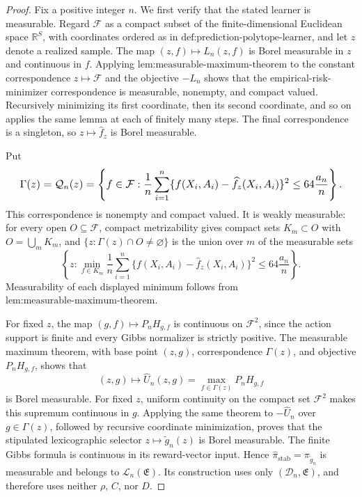 \documentclass{article}
\begin{document}
\begin{proof}
Fix a positive integer \(n\). We first verify that the stated learner is measurable. Regard \(\mathcal F\) as a compact subset of the finite-dimensional Euclidean space \(\mathbb R^S\), with coordinates ordered as in \(\text{def:prediction-polytope-learner}\), and let \(z\) denote a realized sample. The map \((z,f)\mapsto L_n(z,f)\) is Borel measurable in \(z\) and continuous in \(f\). Applying \(\text{lem:measurable-maximum-theorem}\) to the constant correspondence \(z\mapsto\mathcal F\) and the objective \(-L_n\) shows that the empirical-risk-minimizer correspondence is measurable, nonempty, and compact valued. Recursively minimizing its first coordinate, then its second coordinate, and so on applies the same lemma at each of finitely many steps. The final correspondence is a singleton, so \(z\mapsto\widehat f_z\) is Borel measurable.

Put
\[
\makebox[\linewidth][c]{\resizebox{0.98\linewidth}{!}{\par\noindent \makebox[\linewidth][c]{\resizebox{0.98\linewidth}{!}{\(\displaystyle \displaystyle \Gamma(z)=\mathcal Q_n(z)=\left\{f\in\mathcal F:\frac1n\sum_{i=1}^n\{f(X_i,A_i)-\widehat f_z(X_i,A_i)\}^2\le64\frac{a_n}{n}\right\}.\)}}\par\noindent}}
\]
This correspondence is nonempty and compact valued. It is weakly measurable: for every open \(O\subseteq\mathcal F\), compact metrizability gives compact sets \(K_m\subset O\) with \(O=\bigcup_mK_m\), and \(\{z:\Gamma(z)\cap O\ne\varnothing\}\) is the union over \(m\) of the measurable sets
\[
\left\{z:\min_{f\in K_m}\frac1n\sum_{i=1}^n\{f(X_i,A_i)-\widehat f_z(X_i,A_i)\}^2\le64\frac{a_n}{n}\right\}.
\]
Measurability of each displayed minimum follows from \(\text{lem:measurable-maximum-theorem}\).

For fixed \(z\), the map \((g,f)\mapsto P_nH_{g,f}\) is continuous on \(\mathcal F^2\), since the action support is finite and every Gibbs normalizer is strictly positive. The measurable maximum theorem, with base point \((z,g)\), correspondence \(\Gamma(z)\), and objective \(P_nH_{g,f}\), shows that
\[
(z,g)\longmapsto\widehat U_n(z,g)=\max_{f\in\Gamma(z)}P_nH_{g,f}
\]
is Borel measurable. For fixed \(z\), uniform continuity on the compact set \(\mathcal F^2\) makes this supremum continuous in \(g\). Applying the same theorem to \(-\widehat U_n\) over \(g\in\Gamma(z)\), followed by recursive coordinate minimization, proves that the stipulated lexicographic selector \(z\mapsto\widetilde g_n(z)\) is Borel measurable. The finite Gibbs formula is continuous in its reward-vector input. Hence \(\widehat\pi_{\mathrm{stab}}=\pi_{\widetilde g_n}\) is measurable and belongs to \(\mathcal L_n(\mathfrak E)\). Its construction uses only \((\mathcal D_n,\mathfrak E)\), and therefore uses neither \(\rho\), \(C\), nor \(D\).


\end{proof}
\end{document}
